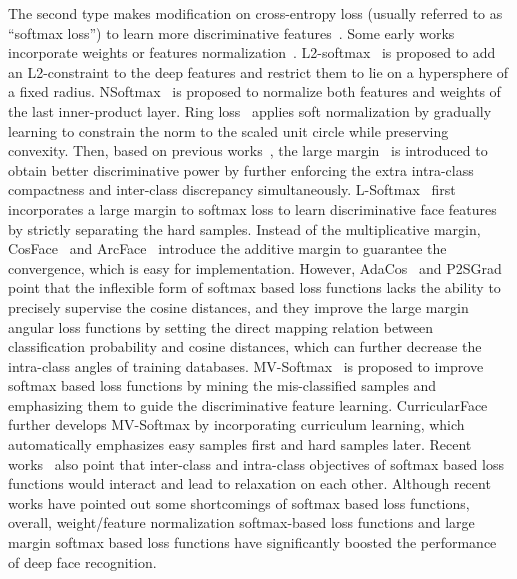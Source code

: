 \documentclass[journal,comsoc]{IEEEtran}
\begin{document}
The second type makes modification on cross-entropy loss (usually referred to as ``softmax loss'') to learn more discriminative features~\cite{wang2017normface,Liu2017SphereFace,deng2019arcface}. Some early works incorporate weights or features normalization~\cite{Ranjan17,wang2017normface,Zheng18ring}. L2-softmax~\cite{Ranjan17} is proposed to add an L2-constraint to the deep features and restrict them to lie on a hypersphere of a fixed radius. NSoftmax~\cite{wang2017normface} is proposed to normalize both features and weights of the last inner-product layer. Ring loss~\cite{Zheng18ring} applies soft normalization by gradually learning to constrain the norm to the scaled unit circle while preserving convexity. Then, based on previous works~\cite{Ranjan17,wang2017normface}, the large margin~\cite{Liu2016Large,Wang2018CosFace,deng2019arcface} is introduced to obtain better discriminative power by further enforcing the extra intra-class compactness and inter-class discrepancy simultaneously. L-Softmax~\cite{Liu2016Large} first incorporates a large margin to softmax loss to learn discriminative face features by strictly separating the hard samples. Instead of the multiplicative margin, CosFace~\cite{Wang2018CosFace} and ArcFace~\cite{deng2019arcface} introduce the additive margin to guarantee the convergence, which is easy for implementation. However, AdaCos~\cite{zhang2019adacos} and P2SGrad~\cite{zhang2019p2sgrad} point that the inflexible form of softmax based loss functions lacks the ability to precisely supervise the cosine distances, and they improve the large margin angular loss functions by setting the direct mapping relation between classification probability and cosine distances, which can further decrease the intra-class angles of training databases. MV-Softmax~\cite{wang2019mis} is proposed to improve softmax based loss functions by mining the mis-classified samples and emphasizing them to guide the discriminative feature learning. CurricularFace~\cite{huang2020curricularface} further develops MV-Softmax by incorporating curriculum learning, which automatically emphasizes easy samples first and hard samples later. Recent works~\cite{deng2019arcface,he2019softmax} also point that inter-class and intra-class objectives of softmax based loss functions would interact and lead to relaxation on each other. Although recent works have pointed out some shortcomings of softmax based loss functions, overall, weight/feature normalization softmax-based loss functions and large margin softmax based loss functions have significantly boosted the performance of deep face recognition. 
\end{document}
